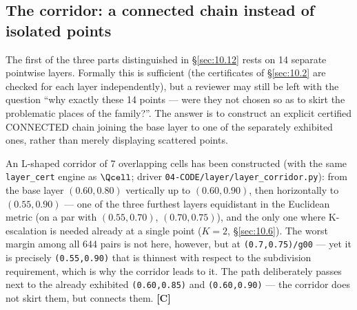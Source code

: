 \subsection{The corridor: a connected chain instead of isolated points}
\label{sec:10.13}

The first of the three parts distinguished in \S\ref{sec:10.12} rests on 14
separate pointwise layers. Formally this is sufficient (the certificates of \S\ref{sec:10.2} are checked for
each layer independently), but a reviewer may still be left with the question
``why exactly these 14 points --- were they not chosen so as to skirt the
problematic places of the family?''. The answer is to construct an explicit
certified CONNECTED chain joining the base layer to one of the separately
exhibited ones, rather than merely displaying scattered points.

An L-shaped corridor of 7 overlapping cells has been constructed (with the
same \texttt{layer\_cert} engine as $\Qcell$; driver \texttt{04-\allowbreak CODE/\allowbreak layer/\allowbreak layer\_\allowbreak corridor.py}):
from the base
layer $(0.60,0.80)$ vertically up to $(0.60,0.90)$, then horizontally to
$(0.55,0.90)$ --- one of the three furthest layers equidistant in the
Euclidean metric (on a par with $(0.55,0.70)$, $(0.70,0.75)$), and the only
one where K-escalation is needed already at a single point ($K=2$, \S\ref{sec:10.6}). The
worst margin among all 644 pairs is not here, however, but at
\texttt{(0.7,0.75)/\allowbreak g00} --- yet it is precisely \texttt{(0.55,0.90)} that is thinnest with
respect to the subdivision requirement, which is why the corridor leads to it.
The path deliberately passes next to the already exhibited \texttt{(0.60,0.85)} and
\texttt{(0.60,0.90)} --- the corridor does not skirt them, but connects them. \textbf{[C]}

